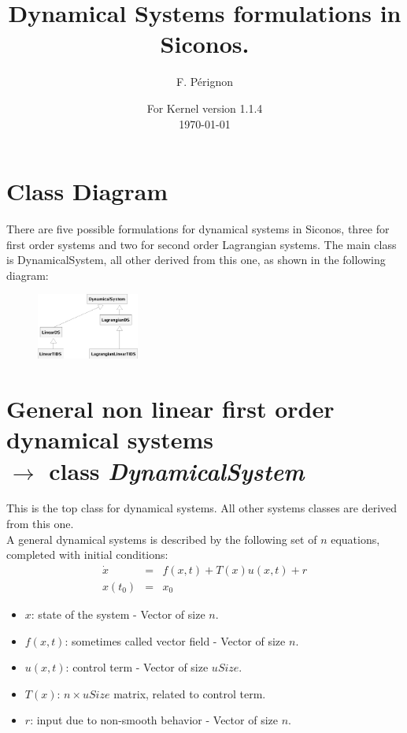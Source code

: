 \documentclass[10pt]{article}
\begin{document}
\thispagestyle{empty}
\title{Dynamical Systems formulations in Siconos.}
\author{F. P\'erignon}

\date{For Kernel version 1.1.4 \\
 \today}
\maketitle

\pagestyle{fancy}

\section{Class Diagram}
There are five possible formulations for dynamical systems in Siconos,
three for first order systems and two for second order Lagrangian systems. The main class is DynamicalSystem, all other derived from this one, as shown in the following diagram:
\begin{figure}[htbp]
  \centering
 \includegraphics[width=0.3\textwidth]{./DSClassDiagram.eps}
  \label{DSDiagram}
\end{figure}
\section{General non linear first order dynamical systems \\ $\rightarrow$ class \it{DynamicalSystem}}
This is the top class for dynamical systems. All other systems classes are derived from this one. \\

A general dynamical systems is described by the following set of $n$ equations, completed with initial conditions:
\begin{eqnarray} \label{firstOrderSystem}
  \dot x &=& f(x,t) + T(x) u(x, t) + r \\
  x(t_0)&=&x_0 
\end{eqnarray}

\begin{itemize}
\item $x$: state of the system - Vector of size $n$.
\item $f(x,t)$: sometimes called vector field - Vector of size $n$.
\item $u(x, t)$: control term - Vector of size $uSize$.
\item $T(x)$: $n\times uSize$ matrix, related to control term.
\item $r$: input due to non-smooth behavior - Vector of size $n$.
\end{itemize}
\end{document}
